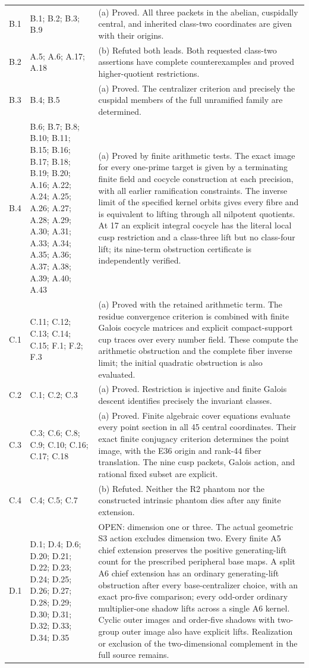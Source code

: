 \begin{longtable}{@{}p{1.1cm}p{3.0cm}p{10.3cm}@{}}
B.1 & B.1; B.2; B.3; B.9 & (a) Proved. All three packets in the abelian, cuspidally central, and inherited class-two coordinates are given with their origins. \\
B.2 & A.5; A.6; A.17; A.18 & (b) Refuted both leads. Both requested class-two assertions have complete counterexamples and proved higher-quotient restrictions. \\
B.3 & B.4; B.5 & (a) Proved. The centralizer criterion and precisely the cuspidal members of the full unramified family are determined. \\
B.4 & B.6; B.7; B.8; B.10; B.11; B.15; B.16; B.17; B.18; B.19; B.20; A.16; A.22; A.24; A.25; A.26; A.27; A.28; A.29; A.30; A.31; A.33; A.34; A.35; A.36; A.37; A.38; A.39; A.40; A.43 & (a) Proved by finite arithmetic tests. The exact image for every one-prime target is given by a terminating finite field and cocycle construction at each precision, with all earlier ramification constraints. The inverse limit of the specified kernel orbits gives every fibre and is equivalent to lifting through all nilpotent quotients. At 17 an explicit integral cocycle has the literal local cusp restriction and a class-three lift but no class-four lift; its nine-term obstruction certificate is independently verified. \\
C.1 & C.11; C.12; C.13; C.14; C.15; F.1; F.2; F.3 & (a) Proved with the retained arithmetic term. The residue convergence criterion is combined with finite Galois cocycle matrices and explicit compact-support cup traces over every number field. These compute the arithmetic obstruction and the complete fiber inverse limit; the initial quadratic obstruction is also evaluated. \\
C.2 & C.1; C.2; C.3 & (a) Proved. Restriction is injective and finite Galois descent identifies precisely the invariant classes. \\
C.3 & C.3; C.6; C.8; C.9; C.10; C.16; C.17; C.18 & (a) Proved. Finite algebraic cover equations evaluate every point section in all 45 central coordinates. Their exact finite conjugacy criterion determines the point image, with the E36 origin and rank-44 fiber translation. The nine cusp packets, Galois action, and rational fixed subset are explicit. \\
C.4 & C.4; C.5; C.7 & (b) Refuted. Neither the R2 phantom nor the constructed intrinsic phantom dies after any finite extension. \\
D.1 & D.1; D.4; D.6; D.20; D.21; D.22; D.23; D.24; D.25; D.26; D.27; D.28; D.29; D.30; D.31; D.32; D.33; D.34; D.35 & OPEN: dimension one or three. The actual geometric S3 action excludes dimension two. Every finite A5 chief extension preserves the positive generating-lift count for the prescribed peripheral base maps. A split A6 chief extension has an ordinary generating-lift obstruction after every base-centralizer choice, with an exact pro-five comparison; every odd-order ordinary multiplier-one shadow lifts across a single A6 kernel. Cyclic outer images and order-five shadows with two-group outer image also have explicit lifts. Realization or exclusion of the two-dimensional complement in the full source remains. \\

\end{longtable}
